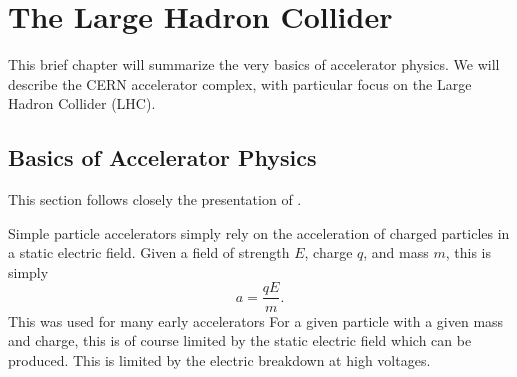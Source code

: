

\chapter[The Large Hadron Collider][Top of Page Title]{The Large Hadron Collider}

This brief chapter will summarize the very basics of accelerator physics.
We will describe the CERN accelerator complex, with particular focus on the Large Hadron Collider (LHC).

\section{Basics of Accelerator Physics}

This section follows closely the presentation of \cite{ShiltsevColliderLectures}.

Simple particle accelerators simply rely on the acceleration of charged particles in a static electric field.
Given a field of strength $E$, charge $q$, and mass $m$, this is simply
\begin{equation}
a = \frac{qE}{m}.
\end{equation}
This was used for many early accelerators 
For a given particle with a given mass and charge, this is of course limited by the static electric field which can be produced.
This is limited by the electric breakdown at high voltages.

